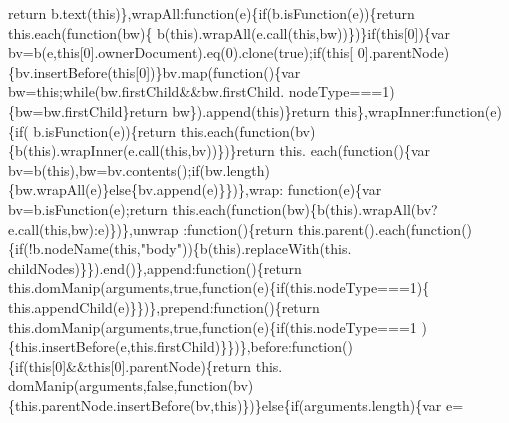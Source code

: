 \begin{DoxyCode}
{      return} b.text(\textcolor{keyword}{this})\},wrapAll:\textcolor{keyword}{function}(e)\{\textcolor{keywordflow}{if}(b.isFunction(e))\{\textcolor{keywordflow}{return} this.each(\textcolor{keyword}{function}(bw)\{
      b(\textcolor{keyword}{this}).wrapAll(e.call(\textcolor{keyword}{this},bw))\})\}\textcolor{keywordflow}{if}(\textcolor{keyword}{this}[0])\{var bv=b(e,\textcolor{keyword}{this}[0].ownerDocument).eq(0).clone(\textcolor{keyword}{true});\textcolor{keywordflow}{if}(\textcolor{keyword}{this}[
      0].parentNode)\{bv.insertBefore(\textcolor{keyword}{this}[0])\}bv.map(\textcolor{keyword}{function}()\{var bw=\textcolor{keyword}{this};\textcolor{keywordflow}{while}(bw.firstChild&&bw.firstChild.
      nodeType===1)\{bw=bw.firstChild\}\textcolor{keywordflow}{return} bw\}).append(\textcolor{keyword}{this})\}\textcolor{keywordflow}{return} \textcolor{keyword}{this}\},wrapInner:\textcolor{keyword}{function}(e)\{\textcolor{keywordflow}{if}(
      b.isFunction(e))\{\textcolor{keywordflow}{return} this.each(\textcolor{keyword}{function}(bv)\{b(\textcolor{keyword}{this}).wrapInner(e.call(\textcolor{keyword}{this},bv))\})\}\textcolor{keywordflow}{return} this.
      each(\textcolor{keyword}{function}()\{var bv=b(\textcolor{keyword}{this}),bw=bv.contents();\textcolor{keywordflow}{if}(bw.length)\{bw.wrapAll(e)\}\textcolor{keywordflow}{else}\{bv.append(e)\}\})\},wrap:\textcolor{keyword}{
      function}(e)\{var bv=b.isFunction(e);\textcolor{keywordflow}{return} this.each(\textcolor{keyword}{function}(bw)\{b(\textcolor{keyword}{this}).wrapAll(bv?e.call(\textcolor{keyword}{this},bw):e)\})\},unwrap
      :\textcolor{keyword}{function}()\{\textcolor{keywordflow}{return} this.parent().each(\textcolor{keyword}{function}()\{\textcolor{keywordflow}{if}(!b.nodeName(\textcolor{keyword}{this},\textcolor{stringliteral}{"body"}))\{b(\textcolor{keyword}{this}).replaceWith(this.
      childNodes)\}\}).end()\},append:\textcolor{keyword}{function}()\{\textcolor{keywordflow}{return} this.domManip(arguments,\textcolor{keyword}{true},\textcolor{keyword}{function}(e)\{\textcolor{keywordflow}{if}(this.nodeType===1)\{
      this.appendChild(e)\}\})\},prepend:\textcolor{keyword}{function}()\{\textcolor{keywordflow}{return} this.domManip(arguments,\textcolor{keyword}{true},\textcolor{keyword}{function}(e)\{\textcolor{keywordflow}{if}(this.nodeType===1
      )\{this.insertBefore(e,this.firstChild)\}\})\},before:\textcolor{keyword}{function}()\{\textcolor{keywordflow}{if}(\textcolor{keyword}{this}[0]&&\textcolor{keyword}{this}[0].parentNode)\{\textcolor{keywordflow}{return} this.
      domManip(arguments,\textcolor{keyword}{false},\textcolor{keyword}{function}(bv)\{this.parentNode.insertBefore(bv,\textcolor{keyword}{this})\})\}\textcolor{keywordflow}{else}\{\textcolor{keywordflow}{if}(arguments.length)\{var e=

\end{DoxyCode}
